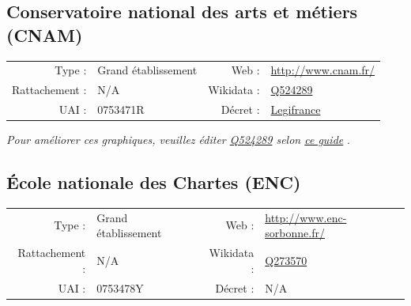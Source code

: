 \documentclass[12pt,french,landscape]{article}
\begin{document}

\newpage

\hypertarget{conservatoire-national-des-arts-et-muxe9tiers-cnam}{%
\subsection{Conservatoire national des arts et métiers
(CNAM)}\label{conservatoire-national-des-arts-et-muxe9tiers-cnam}}

\begin{tabular*}{0.45\textwidth}{rp{2cm}rl}  
\hline  
Type : & Grand établissement & Web : &\href{http://www.cnam.fr/}{http://www.cnam.fr/} \\  
Rattachement : & N/A & Wikidata : & \href{https://www.wikidata.org/entity/Q524289}{Q524289} \\  
UAI : & 0753471R & Décret : & \href{http://www.legifrance.gouv.fr/affichTexte.do?dateTexte=&categorieLien=id&cidTexte=JORFTEXT000021292171&fastPos=1&fastReqId=2018633024&oldAction=rechExpTexteJorf}{Legifrance} \\  
\hline  
\end{tabular*}

\textit{\scriptsize Pour améliorer ces graphiques, veuillez éditer \href{https://www.wikidata.org/entity/Q524289}{Q524289}  selon \href{https://github.com/cpesr/wikidataESR/blob/master/Rmd/wikidataESR.md}{ce guide}}
.


\newpage

\hypertarget{uxe9cole-nationale-des-chartes-enc}{%
\subsection{École nationale des Chartes
(ENC)}\label{uxe9cole-nationale-des-chartes-enc}}

\begin{tabular*}{0.45\textwidth}{rp{2cm}rl}  
\hline  
Type : & Grand établissement & Web : &\href{http://www.enc-sorbonne.fr/}{http://www.enc-sorbonne.fr/} \\  
Rattachement : & N/A & Wikidata : & \href{https://www.wikidata.org/entity/Q273570}{Q273570} \\  
UAI : & 0753478Y & Décret : & N/A \\  
\hline  
\end{tabular*}
\end{document}
